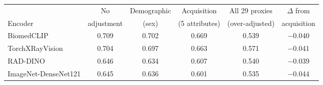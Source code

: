 \begin{tabular}{lccccc}
\toprule
& No & Demographic & Acquisition & All 29 proxies & $\Delta$ from \\
Encoder & adjustment & (sex) & (5 attributes) & (over-adjusted) & acquisition \\
\midrule
BiomedCLIP & 0.709 & 0.702 & 0.669 & 0.539 & $-$0.040 \\
TorchXRayVision & 0.704 & 0.697 & 0.663 & 0.571 & $-$0.041 \\
RAD-DINO & 0.646 & 0.634 & 0.607 & 0.540 & $-$0.039 \\
ImageNet-DenseNet121 & 0.645 & 0.636 & 0.601 & 0.535 & $-$0.044 \\
\bottomrule
\end{tabular}
